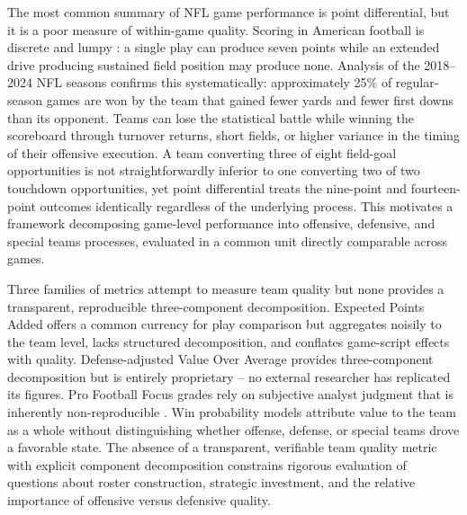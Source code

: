 \documentclass[12pt,a4paper]{article}
\begin{document}
The most common summary of NFL game performance is point differential, but it is a poor measure of within-game quality. Scoring in American football is discrete and lumpy \citep{lopez2018randomness}: a single play can produce seven points while an extended drive producing sustained field position may produce none. Analysis of the 2018--2024 NFL seasons confirms this systematically: approximately 25\% of regular-season games are won by the team that gained fewer yards and fewer first downs than its opponent. Teams can lose the statistical battle while winning the scoreboard through turnover returns, short fields, or higher variance in the timing of their offensive execution. A team converting three of eight field-goal opportunities is not straightforwardly inferior to one converting two of two touchdown opportunities, yet point differential treats the nine-point and fourteen-point outcomes identically regardless of the underlying process. This motivates a framework decomposing game-level performance into offensive, defensive, and special teams processes, evaluated in a common unit directly comparable across games.

Three families of metrics attempt to measure team quality but none provides a transparent, reproducible three-component decomposition. Expected Points Added \citep[EPA;][]{carl2021nflfastr} offers a common currency for play comparison but aggregates noisily to the team level, lacks structured decomposition, and conflates game-script effects with quality. Defense-adjusted Value Over Average \citep[DVOA;][]{schatz2005dvoa} provides three-component decomposition but is entirely proprietary -- no external researcher has replicated its figures. Pro Football Focus grades rely on subjective analyst judgment that is inherently non-reproducible \citep{pff2014grades}. Win probability models \citep{lock2014randomforests} attribute value to the team as a whole without distinguishing whether offense, defense, or special teams drove a favorable state. The absence of a transparent, verifiable team quality metric with explicit component decomposition constrains rigorous evaluation of questions about roster construction, strategic investment, and the relative importance of offensive versus defensive quality.
\end{document}
